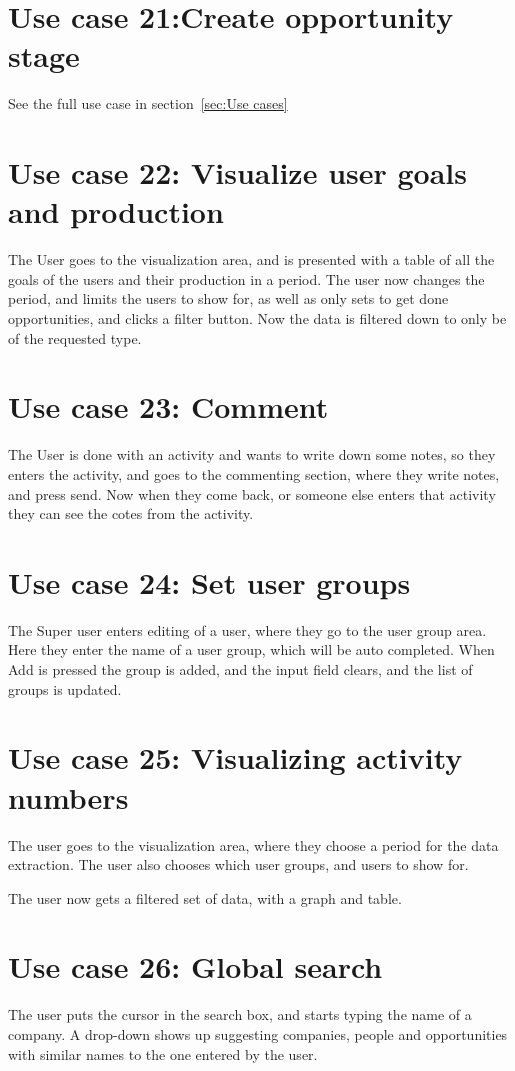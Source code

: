 \section{Use case 21:Create opportunity stage }
See the full use case in section~\ref{sec:Use cases}

\section{Use case 22: Visualize user goals and production}
\label{app:usecase:visualizegoalsproduction}
The User goes to the visualization area, and is presented with a table of all
the goals of the users and their production in a period. The user now changes
the period, and limits the users to show for, as well as only sets to get done
opportunities, and clicks a filter button. Now the data is filtered down to only
be of the requested type. 

\section{Use case 23: Comment}
The User is done with an activity and wants to write down some notes, so they
enters the activity, and goes to the commenting section, where they write notes,
and press send. Now when they come back, or someone else enters that activity
they can see the cotes from the activity. 

\section{Use case 24: Set user groups }
The Super user enters editing of a user, where they go to the user group area.
Here they enter the name of a user group, which will be auto completed. When Add
is pressed the group is added, and the input field clears, and the list of
groups is updated.

\section{Use case 25:  Visualizing activity numbers}
The user goes to the visualization area, where they choose a period for the
data extraction. The user also chooses which user groups, and users to show for.

The user now gets a filtered set of data, with a graph and table.

\section{Use case 26: Global search}
The user puts the cursor in the search box, and starts typing the name of a
company. A drop-down shows up suggesting companies, people and opportunities with
similar names to the one entered by the user.

